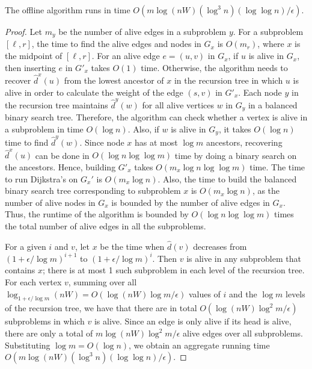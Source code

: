 \begin{lemma}
\label{lem:offline-runtime}
    The offline algorithm runs in time $O(m\log (nW)  (\log^3 n) (\log \log n)/\epsilon)$.
\end{lemma}
\begin{proof}
    Let $m_y$ be the number of alive edges in a subproblem $y$.
    For a subproblem $[\ell, r]$, the time to find the alive edges and nodes in $G_x$ is $O(m_r)$, where $x$ is the midpoint of $[\ell, r]$. 
    For an alive edge $e = (u,v)$ in $G_x$, if $u$ is alive in $G_x$, then inserting $e$ in $G'_x$ takes $O(1)$ time.
    Otherwise, the algorithm needs to recover $\hat{d}^x(u)$ from the lowest ancestor of $x$ in the recursion tree in which $u$ is alive in order to calculate the weight of the edge $(s, v)$ in $G'_x$. 
    Each node $y$ in the recursion tree maintains $\hat{d}^{y}(w)$ for all alive vertices $w$ in $G_{y}$ in a balanced binary search tree.
    Therefore, the algorithm can check whether a vertex is alive in a subproblem in time $O(\log n)$.
    Also, if $w$ is alive in $G_y$, it takes $O(\log n)$ time to find $\hat{d}^y(w)$.
    Since node $x$ has at most $\log m$ ancestors, recovering $\hat{d}^x(u)$ can be done in $O(\log n \log\log m)$ time by doing a binary search on the ancestors.
    Hence, building $G'_x$ takes $O(m_x\log n \log\log m)$ time. 
    The time to run Dijkstra's on $G_x'$ is $O(m_x \log n)$.
    Also, the time to build the balanced binary search tree corresponding to subproblem $x$ is $O(m_x \log n)$, as the number of alive nodes in $G_x$ is bounded by the number of alive edges in $G_x$.
    Thus, the runtime of the algorithm is bounded by $O(\log n \log \log m)$ times the total number of alive edges in all the subproblems.
    
    For a given $i$ and $v$, let $x$ be the time when $\hat{d}(v)$ decreases from $( 1 + \epsilon/\log m)^{i+1}$ to $(1 + \epsilon/\log m)^i$.  
    Then $v$ is alive in any subproblem that contains $x$; there is at most 1 such subproblem in each level of the recursion tree.
    For each vertex $v$, summing over all $\log_{1 + \epsilon/\log m} (nW) = O(\log (nW) \log m/\epsilon)$ values of $i$ and the $\log m$ levels of the recursion tree, we have that there are in total $O(\log (nW) \log^2 m/\epsilon)$ subproblems in which $v$ is alive.
    Since an edge is only alive if its head is alive, there are only a total of $m \log (nW) \log^2 m/\epsilon$ alive edges over all subproblems.  
    Substituting $\log m = O(\log n)$, we obtain an aggregate running time $O(m\log (nW)(\log^3 n)(\log \log n)/\epsilon)$. 
\end{proof}